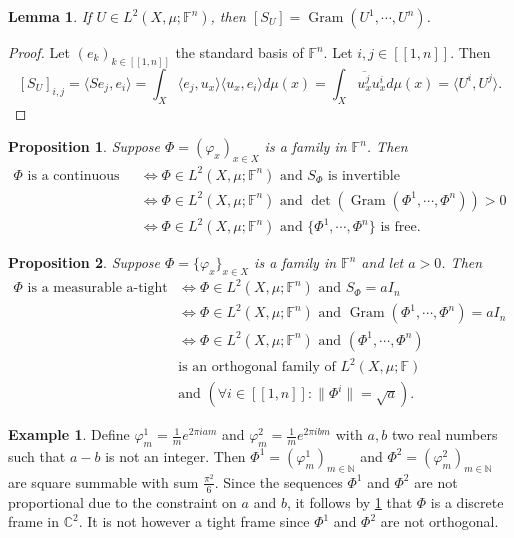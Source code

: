 \documentclass[a4paper,12pt]{article}
\DeclareMathOperator{\Gram}{Gram}
\theoremstyle{plain}
\newtheorem{proposition}{Proposition}[section]
\newtheorem{lemma}{Lemma}[section]
\theoremstyle{definition}
\newtheorem{example}{Example}[section]
\theoremstyle{remark}
\begin{document}
\begin{lemma}
If $U \in L^2(X,\mu;\mathbb{F}^n)$, then $[S_U] = \Gram(U^1, \cdots, U^n)$.
\end{lemma}

\begin{proof}
Let $(e_k)_{k \in [\![1,n]\!]}$ the standard basis of $\mathbb{F}^n$. Let $i,j \in [\![1,n]\!]$. Then \[ [S_U]_{i,j} = \langle S e_j , e_i \rangle = \int_X \langle e_j , u_x \rangle \langle u_x , e_i \rangle d\mu(x) =  \int_X \overline{u_x^j} u_x^i d\mu(x) = \langle U^i , U^j \rangle. \]
\end{proof}

\begin{proposition} \cite{Christensen}
\label{PropCharFrames}
Suppose $\Phi = (\varphi_x)_{x \in X}$ is a family in $\mathbb{F}^n$. Then
\begin{align*}
\Phi \text{ is a continuous frame} &\Leftrightarrow \Phi \in L^2(X,\mu;\mathbb{F}^n) \text{ and } S_\Phi \text{ is invertible} \\
&\Leftrightarrow \Phi \in L^2(X,\mu;\mathbb{F}^n) \mbox{ and } \det(\Gram(\Phi^1,\cdots,\Phi^n)) > 0  \\
&\Leftrightarrow \Phi \in L^2(X,\mu;\mathbb{F}^n) \mbox{ and } \{\Phi^1, \cdots, \Phi^n\} \mbox{ is free}.
\end{align*}
\end{proposition}

\begin{proposition} \cite{Christensen}
\label{PropCharTightFrames}
Suppose $\Phi = \{\varphi_x\}_{x \in X}$ is a family in $\mathbb{F}^n$ and let $a > 0$. Then
\begin{align*}
\Phi \text{ is a measurable a-tight frame} &\Leftrightarrow \Phi \in L^2(X,\mu;\mathbb{F}^n) \mbox{ and } S_\Phi = aI_n \\
&\Leftrightarrow \Phi \in L^2(X,\mu;\mathbb{F}^n) \mbox{ and } \Gram(\Phi^1,\cdots,\Phi^n) = aI_n \\
&\Leftrightarrow \Phi \in L^2(X,\mu;\mathbb{F}^n) \mbox{ and } (\Phi^1,\cdots,\Phi^n) \\
& \text{is an orthogonal family of } L^2(X,\mu;\mathbb{F}) \\
& \text{and } (\forall i \in [\![1,n]\!] : \lVert \Phi^i \rVert = \sqrt{a}).
\end{align*}
\end{proposition}

\begin{example}
Define $\varphi_m^1 = \frac{1}{m} e^{2 \pi i a m }$ and $\varphi_m^2 = \frac{1}{m} e^{2 \pi i b m }$ with $a,b$ two real numbers such that $a-b$ is not an integer. Then $\Phi^1 = (\varphi_m^1)_{m \in \mathbb{N}}$ and $\Phi^2 = (\varphi_m^2)_{m \in \mathbb{N}}$ are square summable with sum $\frac{\pi^2}{6}$. Since the sequences $\Phi^1$ and $\Phi^2$ are not proportional due to the constraint on $a$ and $b$,  it follows by \ref{PropCharFrames} that $\Phi$ is a discrete frame in $\mathbb{C}^2$. It is not however a tight frame since $\Phi^1$ and $\Phi^2$ are not orthogonal.
\end{example}
\end{document}
